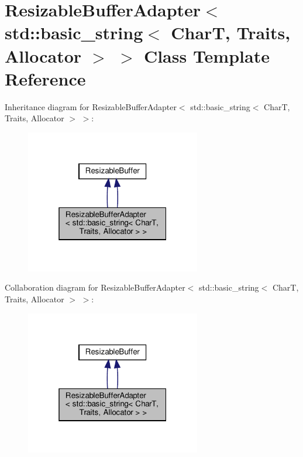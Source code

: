 \hypertarget{classResizableBufferAdapter_3_01std_1_1basic__string_3_01CharT_00_01Traits_00_01Allocator_01_4_01_4}{}\section{Resizable\+Buffer\+Adapter$<$ std\+:\+:basic\+\_\+string$<$ CharT, Traits, Allocator $>$ $>$ Class Template Reference}
\label{classResizableBufferAdapter_3_01std_1_1basic__string_3_01CharT_00_01Traits_00_01Allocator_01_4_01_4}


Inheritance diagram for Resizable\+Buffer\+Adapter$<$ std\+:\+:basic\+\_\+string$<$ CharT, Traits, Allocator $>$ $>$\+:
\nopagebreak
\begin{figure}[H]
\begin{center}
\leavevmode
\includegraphics[width=217pt]{classResizableBufferAdapter_3_01std_1_1basic__string_3_01CharT_00_01Traits_00_01Allocator_01_4_01_4__inherit__graph}
\end{center}
\end{figure}


Collaboration diagram for Resizable\+Buffer\+Adapter$<$ std\+:\+:basic\+\_\+string$<$ CharT, Traits, Allocator $>$ $>$\+:
\nopagebreak
\begin{figure}[H]
\begin{center}
\leavevmode
\includegraphics[width=217pt]{classResizableBufferAdapter_3_01std_1_1basic__string_3_01CharT_00_01Traits_00_01Allocator_01_4_01_4__coll__graph}
\end{center}
\end{figure}
